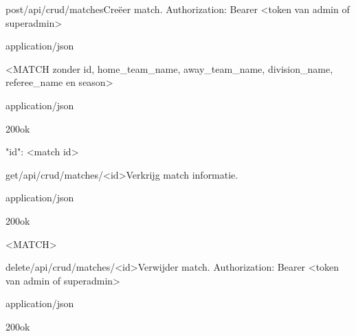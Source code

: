 \documentclass[10pt]{article}
\begin{document}
\begin{apiRoute}{post}{/api/crud/matches}{Creëer match.}
 Authorization: Bearer <token van admin of superadmin>
	\begin{routeRequest}{application/json}
		\begin{routeRequestBody}
<MATCH zonder id, home_team_name, away_team_name, division_name, referee_name en season>
		\end{routeRequestBody}
	\end{routeRequest}

	\begin{routeResponse}{application/json}
		\begin{routeResponseItem}{200}{ok}
			\begin{routeResponseItemBody}
{
	"id": <match id>
}
			\end{routeResponseItemBody}
		\end{routeResponseItem}
	\end{routeResponse}
\end{apiRoute}

\begin{apiRoute}{get}{/api/crud/matches/<id>}{Verkrijg match informatie.}
	\begin{routeParameter}
	\end{routeParameter}

	\begin{routeResponse}{application/json}
		\begin{routeResponseItem}{200}{ok}
			\begin{routeResponseItemBody}
<MATCH>
			\end{routeResponseItemBody}
		\end{routeResponseItem}
	\end{routeResponse}
\end{apiRoute}

\begin{apiRoute}{delete}{/api/crud/matches/<id>}{Verwijder match.}
 Authorization: Bearer <token van admin of superadmin>
	\begin{routeParameter}
		\routeParamItem{id}{match id}
	\end{routeParameter}

	\begin{routeResponse}{application/json}
		\begin{routeResponseItem}{200}{ok}
			\begin{routeResponseItemBody}
			\end{routeResponseItemBody}
		\end{routeResponseItem}
	\end{routeResponse}
\end{apiRoute}
\end{document}
